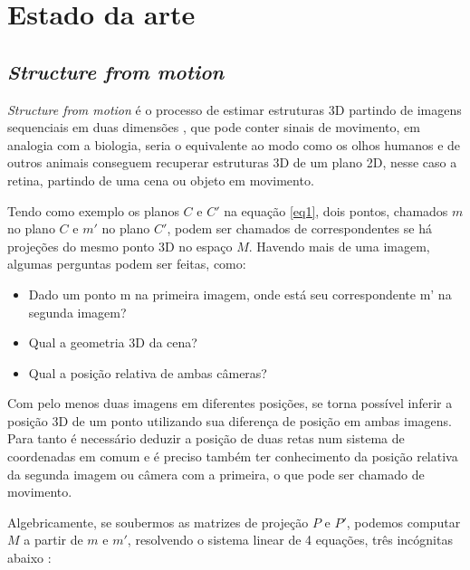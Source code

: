 
\chapter{Estado da arte}

\section{\textit{Structure from motion}}

\textit{Structure from motion} é o processo de estimar estruturas 3D partindo de imagens sequenciais em duas dimensões \cite{SFM}, que pode conter sinais de movimento, em analogia com a biologia, seria o equivalente ao modo  como os olhos humanos e de outros animais conseguem recuperar estruturas 3D de um plano 2D, nesse caso a retina, partindo de uma cena ou objeto em movimento.

Tendo como exemplo os planos $C$ e $C'$ na equação \eqref{eq1}, dois pontos, chamados $m$ no plano $C$ e $m'$ no plano $C'$, podem ser chamados de correspondentes se há projeções do mesmo ponto 3D no espaço $M$. Havendo mais de uma imagem, algumas perguntas podem ser feitas, como:

\begin{itemize}
	\item{Dado um ponto m na primeira imagem, onde está seu correspondente m’ na segunda imagem?}
	\item{Qual a geometria 3D da cena?}
	\item{Qual a posição relativa de ambas câmeras?}
\end{itemize}
	
Com pelo menos duas imagens em diferentes posições, se torna possível inferir a posição 3D de um ponto utilizando sua diferença de posição em ambas imagens. Para tanto é necessário deduzir a posição de duas retas num sistema de coordenadas em comum e é preciso também ter conhecimento da posição relativa da segunda imagem ou câmera com a primeira, o que pode ser chamado de movimento.

Algebricamente, se soubermos as matrizes de projeção $P$ e $P'$, podemos computar $M$ a partir de $m$ e $m'$, resolvendo o sistema linear de 4 equações, três incógnitas abaixo \cite{Faugeras-Geometry}:


